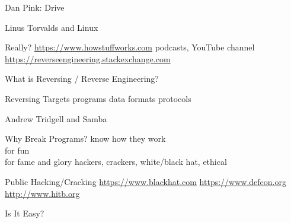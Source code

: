 \documentclass{simple}
\begin{document}
\begin{frame}{Dan Pink: Drive}
\end{frame}

\begin{frame}{Linus Torvalds and Linux}
\end{frame}

\begin{frame}{Really?}
  \centering
  \pause \url{https://www.howstuffworks.com}
  \vspace{1cm}
  \pause podcasts, YouTube channel
  \vspace{1cm}
  \pause \url{https://reverseengineering.stackexchange.com}
\end{frame}

\begin{frame}{What is Reversing / Reverse Engineering?}
\end{frame}

\begin{frame}{Reversing Targets}
  \centering
  \pause \Large{programs}
  \vspace{1cm}
  \pause \Large{data formats}
  \vspace{1cm}
  \pause \Large{protocols}
\end{frame}

\begin{frame}{Andrew Tridgell and Samba}
\end{frame}

\begin{frame}{Why Break Programs?}
  \centering
  \vspace{1cm}
  \pause know how they work \\
  \pause for fun \\
  \pause for fame and glory
  \pause hackers, crackers, white/black hat, ethical
\end{frame}

\begin{frame}{Public Hacking/Cracking}
  \centering
  \pause \url{https://www.blackhat.com}
  \vspace{1cm}
  \pause \url{https://www.defcon.org}
  \vspace{1cm}
  \pause \url{http://www.hitb.org}
\end{frame}

\begin{frame}{Is It Easy?}
\end{frame}
\end{document}
